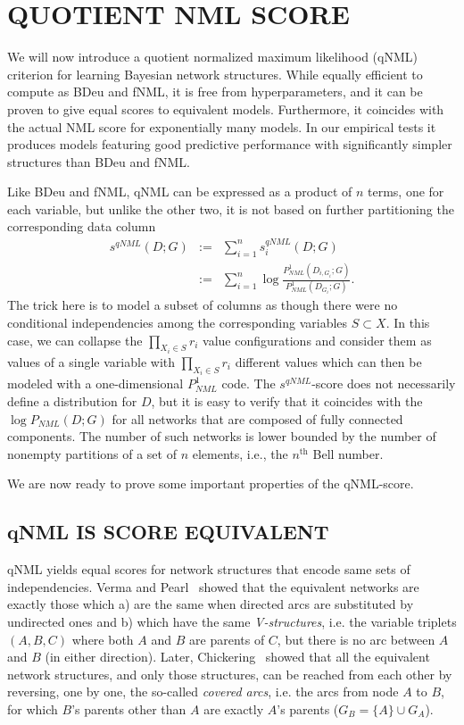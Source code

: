 \section{QUOTIENT NML SCORE}

We will now introduce a quotient normalized maximum likelihood (qNML)
criterion for learning Bayesian network structures.  While equally
efficient to compute as BDeu and fNML, it is free from
hyperparameters, and it can be proven to give equal scores to
equivalent models. Furthermore, it coincides with the actual NML score
for exponentially many models. In our empirical tests it produces
models featuring good predictive performance with significantly
simpler structures than BDeu and fNML.

Like BDeu and fNML, qNML can be expressed as a product of $n$ terms,
one for each variable, but unlike the other two, it is not based on
further partitioning the corresponding data column
\begin{eqnarray}
\label{eqn:qnmldef}
s^{qNML}(D;G) & := & \sum_{i=1}^n s^{qNML}_i(D;G)\\
& := & \sum_{i=1}^n \log \frac{P^1_{NML}(D_{i,G_i};G)}
                             {P^1_{NML}(D_{G_i};G)}.\nonumber
\end{eqnarray}
The trick here is to model a subset of columns as though there were no
conditional independencies among the corresponding variables $S
\subset X$.  In this case, we can collapse the $\prod_{X_i\in S} r_i$
value configurations and consider them as values of a single variable
with $\prod_{X_i\in S} r_i$ different values which can then be modeled
with a one-dimensional $P^1_{NML}$ code.  The $s^{qNML}$-score does
not necessarily define a distribution for $D$, but it is easy to
verify that it coincides with the $\log P_{NML}(D;G)$ for all networks
that are composed of fully connected components.  The number of such
networks is lower bounded by the number of nonempty partitions of a
set of $n$ elements, i.e., the $n^\text{th}$ Bell number.

We are now ready to prove some important properties of the qNML-score.

\subsection {qNML IS SCORE EQUIVALENT}

qNML yields equal scores for network structures that encode same sets
of independencies. Verma and Pearl~\cite{Verm90} showed that the
equivalent networks are exactly those which a) are the same when directed
arcs are substituted by undirected ones and b) which have the same
\textit{V-structures}, i.e. the variable triplets $(A,B,C)$ where both
$A$ and $B$ are parents of $C$, but there is no arc between $A$ and
$B$ (in either direction).  Later, Chickering~\cite{Chick95} showed
that all the equivalent network structures, and only those structures,
can be reached from each other by reversing, one by one, the so-called
\textit{covered arcs}, i.e. the arcs from node $A$ to $B$, for which
$B$'s parents other than $A$ are exactly  $A$'s parents
($G_B=\{A\}\cup G_A$).

